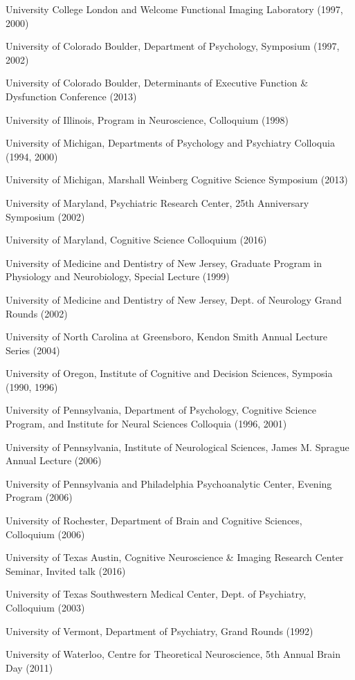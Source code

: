 \documentclass[10 pt]{article}
\begin{document}
University College London and Welcome Functional Imaging Laboratory (1997, 2000)

University of Colorado Boulder, Department of Psychology, Symposium (1997, 2002)

University of Colorado Boulder, Determinants of Executive Function \& Dysfunction Conference (2013)

University of Illinois, Program in Neuroscience, Colloquium (1998)

University of Michigan, Departments of Psychology and Psychiatry Colloquia (1994, 2000)

University of Michigan, Marshall Weinberg Cognitive Science Symposium (2013)

University of Maryland, Psychiatric Research Center, 25th Anniversary Symposium (2002)

University of Maryland, Cognitive Science Colloquium (2016)

University of Medicine and Dentistry of New Jersey, Graduate Program in Physiology and Neurobiology, Special Lecture (1999)

University of Medicine and Dentistry of New Jersey, Dept. of Neurology Grand Rounds (2002)

University of North Carolina at Greensboro, Kendon Smith Annual Lecture Series (2004)

University of Oregon, Institute of Cognitive and Decision Sciences, Symposia (1990, 1996)

University of Pennsylvania, Department of Psychology, Cognitive Science Program, and Institute for Neural Sciences Colloquia (1996, 2001)

University of Pennsylvania, Institute of Neurological Sciences, James M. Sprague Annual Lecture (2006)

University of Pennsylvania and Philadelphia Psychoanalytic Center, Evening Program (2006)

University of Rochester, Department of Brain and Cognitive Sciences, Colloquium (2006)

University of Texas Austin, Cognitive Neuroscience \& Imaging Research Center Seminar, Invited talk (2016)

University of Texas Southwestern Medical Center, Dept. of Psychiatry, Colloquium (2003)

University of Vermont, Department of Psychiatry, Grand Rounds (1992)

University of Waterloo, Centre for Theoretical Neuroscience, 5th Annual Brain Day (2011)
\end{document}
